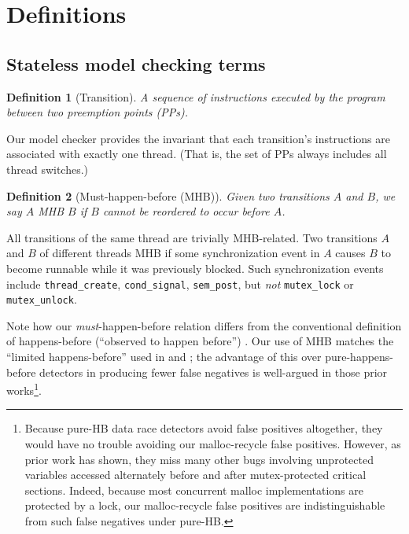 \documentclass[pldi]{sigplanconf-pldi15}
\newtheorem{definition}{Definition}
\begin{document}
\section{Definitions}

\subsection{Stateless model checking terms}

\begin{definition}[Transition]
A sequence of instructions executed by the program between two preemption points (PPs).
\label{def:transition}
\end{definition}
Our model checker provides the invariant that each transition's instructions are associated with exactly one thread. (That is, the set of PPs always includes all thread switches.)

\begin{definition}[Must-happen-before (MHB)]
	Given two transitions $A$ and $B$, we say $A$ MHB $B$ if $B$ cannot be reordered to occur before $A$.
\end{definition}
All transitions of the same thread are trivially MHB-related.
Two transitions $A$ and $B$ of different threads MHB if some synchronization event in $A$ causes $B$ to become runnable while it was previously blocked. Such synchronization events include {\tt thread\_create}, {\tt cond\_signal}, {\tt sem\_post}, but {\em not} {\tt mutex\_lock} or {\tt mutex\_unlock}.

Note how our {\em must}-happen-before relation differs from the conventional definition of happens-before (``observed to happen before'') \cite{lamport-clocks}.
Our use of MHB matches the ``limited happens-before'' used in \cite{hybriddatarace} and \cite{tsan};
the advantage of this over pure-happens-before detectors in producing fewer false negatives is well-argued in those prior works\footnote{
Because pure-HB data race detectors avoid false positives altogether, they would have no trouble avoiding our malloc-recycle false positives.
However, as prior work has shown, they miss many other bugs involving unprotected variables accessed alternately before and after mutex-protected critical sections.
Indeed, because most concurrent malloc implementations are protected by a lock,
our malloc-recycle false positives are indistinguishable from such false negatives under pure-HB.
}.
\end{document}
